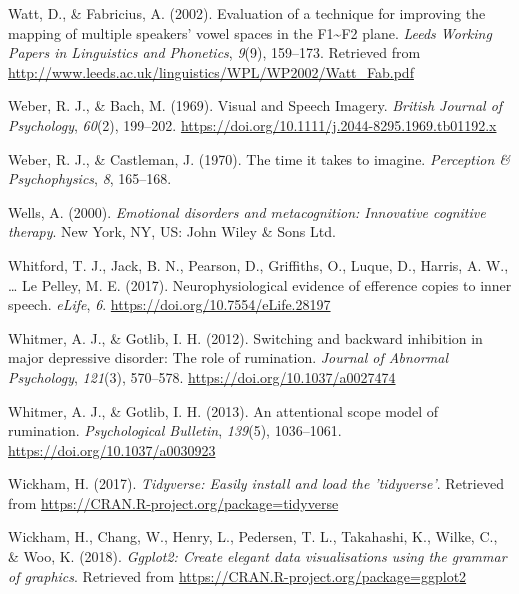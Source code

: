 \documentclass[a4paper,12pt,twoside,onecolumn,openright,final,oldfontcommands]{memoir}
\begin{document}
\leavevmode\hypertarget{ref-watt_evaluation_2002}{}%
Watt, D., \& Fabricius, A. (2002). Evaluation of a technique for improving the mapping of multiple speakers' vowel spaces in the F1\textasciitilde F2 plane. \emph{Leeds Working Papers in Linguistics and Phonetics}, \emph{9}(9), 159--173. Retrieved from \url{http://www.leeds.ac.uk/linguistics/WPL/WP2002/Watt_Fab.pdf}

\leavevmode\hypertarget{ref-weber_visual_1969}{}%
Weber, R. J., \& Bach, M. (1969). Visual and Speech Imagery. \emph{British Journal of Psychology}, \emph{60}(2), 199--202. \url{https://doi.org/10.1111/j.2044-8295.1969.tb01192.x}

\leavevmode\hypertarget{ref-weber_time_1970}{}%
Weber, R. J., \& Castleman, J. (1970). The time it takes to imagine. \emph{Perception \& Psychophysics}, \emph{8}, 165--168.

\leavevmode\hypertarget{ref-wells_emotional_2000}{}%
Wells, A. (2000). \emph{Emotional disorders and metacognition: Innovative cognitive therapy}. New York, NY, US: John Wiley \& Sons Ltd.

\leavevmode\hypertarget{ref-whitford_neurophysiological_2017}{}%
Whitford, T. J., Jack, B. N., Pearson, D., Griffiths, O., Luque, D., Harris, A. W., \ldots{} Le Pelley, M. E. (2017). Neurophysiological evidence of efference copies to inner speech. \emph{eLife}, \emph{6}. \url{https://doi.org/10.7554/eLife.28197}

\leavevmode\hypertarget{ref-whitmer_switching_2012}{}%
Whitmer, A. J., \& Gotlib, I. H. (2012). Switching and backward inhibition in major depressive disorder: The role of rumination. \emph{Journal of Abnormal Psychology}, \emph{121}(3), 570--578. \url{https://doi.org/10.1037/a0027474}

\leavevmode\hypertarget{ref-Whitmer2013}{}%
Whitmer, A. J., \& Gotlib, I. H. (2013). An attentional scope model of rumination. \emph{Psychological Bulletin}, \emph{139}(5), 1036--1061. \url{https://doi.org/10.1037/a0030923}

\leavevmode\hypertarget{ref-R-tidyverse}{}%
Wickham, H. (2017). \emph{Tidyverse: Easily install and load the 'tidyverse'}. Retrieved from \url{https://CRAN.R-project.org/package=tidyverse}

\leavevmode\hypertarget{ref-R-ggplot2}{}%
Wickham, H., Chang, W., Henry, L., Pedersen, T. L., Takahashi, K., Wilke, C., \& Woo, K. (2018). \emph{Ggplot2: Create elegant data visualisations using the grammar of graphics}. Retrieved from \url{https://CRAN.R-project.org/package=ggplot2}
\end{document}
